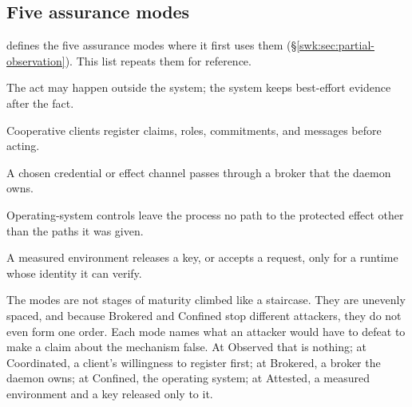 \subsection{Five assurance modes}
 defines the five assurance modes
where it first uses them (\S\ref{swk:sec:partial-observation}). This list
repeats them for reference.
\begin{description}[leftmargin=1.4em,itemsep=3pt]
  \item[Observed] The act may happen outside the system; the system keeps
  best-effort evidence after the fact.
  \item[Coordinated] Cooperative clients register claims, roles, commitments,
  and messages before acting.
  \item[Brokered] A chosen credential or effect channel passes through a broker
  that the daemon owns.
  \item[Confined] Operating-system controls leave the process no path to the
  protected effect other than the paths it was given.
  \item[Attested] A measured environment releases a key, or accepts a request,
  only for a runtime whose identity it can verify.
\end{description}

The modes are not stages of maturity climbed like a staircase. They are
unevenly spaced, and because Brokered and Confined stop different attackers,
they do not even form one order. Each mode names what an attacker would have
to defeat to make a claim about the mechanism false. At Observed that is nothing; at Coordinated,
a client's willingness to register first; at Brokered, a broker the daemon
owns; at Confined, the operating system; at Attested, a measured environment
and a key released only to it.

